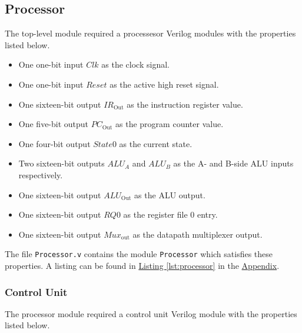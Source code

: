 \subsection{Processor}  \label{subsec:processor}

The top-level module required a processesor Verilog modules with the properties listed below.

\begin{itemize}
    \item One one-bit input $Clk$ as the clock signal.
    \item One one-bit input $Reset$ as the active high reset signal.
    \item One sixteen-bit output $IR_\text{Out}$ as the instruction register value.
    \item One five-bit output $PC_\text{Out}$ as the program counter value.
    \item One four-bit output $State0$ as the current state.
    \item Two sixteen-bit outputs $ALU_A$ and $ALU_B$ as the A- and B-side ALU inputs respectively.
    \item One sixteen-bit output $ALU_\text{Out}$ as the ALU output.
    \item One sixteen-bit output $RQ0$ as the register file 0 entry.
    \item One sixteen-bit output $Mux_\text{out}$ as the datapath multiplexer output.
\end{itemize}

The file \verb|Processor.v| contains the module \verb|Processor| which satisfies these properties.
A listing can be found in \hyperref[lst:processor]{Listing \ref*{lst:processor}} in the \hyperref[sec:appendix]{Appendix}.

\subsubsection{Control Unit} \label{subsub:controlunit}

The processor module required a control unit Verilog module with the properties listed below.

